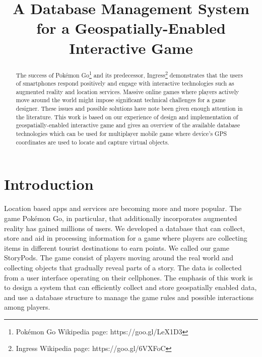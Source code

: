 \documentclass[conference]{IEEEtran}
\begin{document}
\title{A Database Management System for a Geospatially-Enabled Interactive Game}
\author{
\and
{}
\and
{}
\and
{}
}

\maketitle

\begin{abstract}
The success of Pokémon Go\footnote[1]{Pokémon Go Wikipedia page: https://goo.gl/LeX1D3} and its predecessor, Ingress\footnote[2]{Ingress Wikipedia page: https://goo.gl/6VXFoC} demonstrates that the users of smartphones respond positively and engage with interactive technologies such as augmented reality and location services. Massive online games where players actively move around the world might impose significant technical challenges for a game designer. These issues and possible solutions have note been given enough attention in the literature. This work is based on our experience of design and implementation of geospatially-enabled interactive game and gives an overview of the available database technologies which can be used for multiplayer mobile game where device's GPS coordinates are used to locate and capture virtual objects. 
\end{abstract}

\IEEEpeerreviewmaketitle

\section{Introduction}
Location based apps and services are becoming more and more popular. The game Pokémon Go, in particular, that additionally incorporates augmented reality has gained millions of users. We developed a database that can collect, store and aid in processing information for a game where players are collecting items in different tourist destinations to earn points. We called our game StoryPods. The game consist of players moving around the real world and collecting objects that gradually reveal parts of a story. The data is collected from a user interface operating on their cellphones. The emphasis of this work is to design a system that can efficiently collect and store geospatially enabled data, and use a database structure to manage the game rules and possible interactions among players. 
\end{document}
